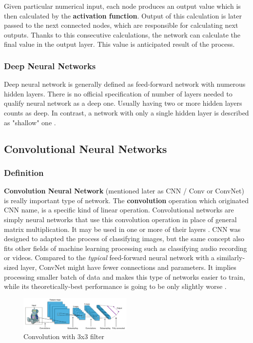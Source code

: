 \documentclass[../Main.tex]{subfiles}
\begin{document}
    Given particular numerical input, each node produces an output value which is then calculated by the \textbf{activation function}. Output of this calculation is later passed to the next connected nodes, which are responsible for calculating next outputs. Thanks to this consecutive calculations, the network can calculate the final value in the output layer. This value is anticipated result of the process.
    
    \subsubsection{Deep Neural Networks}
    Deep neural network is generally defined as feed-forward network with numerous hidden layers. There is no official specification of number of layers needed to qualify neural network as a deep one. Usually having two or more hidden layers counts as deep. In contrast, a network with only a single hidden layer is described as "shallow" one \cite{Goodfellow-et-al-2016}.
    

\subsection{Convolutional Neural Networks}

    \subsubsection{Definition}
    \textbf{Convolution Neural Network} (mentioned later as CNN / Conv or ConvNet) is really important type of network. The \textbf{convolution} operation which originated CNN name, is a specific kind of linear operation. Convolutional networks are simply neural networks that use this convolution operation in place of general matrix multiplication. It may be used in one or more of their layers \cite{Goodfellow-et-al-2016}. CNN was designed to adapted the process of classifying images, but the same concept also fits other fields of machine learning processing such as classifying audio recording or videos. 
    Compared to the \textit{typical} feed-forward neural network with a similarly-sized layer, ConvNet might have fewer connections and parameters. It implies processing smaller batch of data and makes this type of networks easier to train, while its theoretically-best performance is going to be only slightly worse \cite{krizhevsky-imagenet}.

    \begin{figure}[ht!]
        \centering
        \includegraphics[width=0.5\textwidth]{Images/02_cnn_typical_wiki.png}
        \caption{Convolution with 3x3 filter \cite{wiki-cnn}}
        \label{fig:cnn-convolution-typical}
    \end{figure}
        
\end{document}
